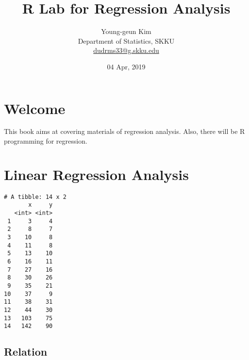 \documentclass[]{book}
\title{R Lab for Regression Analysis}
\author{Young-geun Kim\\
Department of Statistics, SKKU\\
\href{mailto: dudrms33@g.skku.edu}{dudrms33@g.skku.edu}}
\date{04 Apr, 2019}
\newenvironment{Shaded}{\begin{snugshade}}{\end{snugshade}}
\newcommand{\KeywordTok}[1]{\textcolor[rgb]{0.13,0.29,0.53}{\textbf{#1}}}
\newcommand{\DataTypeTok}[1]{\textcolor[rgb]{0.13,0.29,0.53}{#1}}
\newcommand{\StringTok}[1]{\textcolor[rgb]{0.31,0.60,0.02}{#1}}
\newcommand{\OperatorTok}[1]{\textcolor[rgb]{0.81,0.36,0.00}{\textbf{#1}}}
\newcommand{\NormalTok}[1]{#1}
\let\oldmaketitle\maketitle
\theoremstyle{definition}
\theoremstyle{definition}
\theoremstyle{definition}
\theoremstyle{remark}
\begin{document}
\maketitle

\begin{titlepage}
  
\end{titlepage}

\let\maketitle\oldmaketitle
\maketitle

{
\setcounter{tocdepth}{1}
\tableofcontents
}
\chapter*{Welcome}\label{welcome}

 This book aims at covering materials of regression analysis. Also,
there will be R programming for regression.

\chapter*{Linear Regression Analysis}\label{linear-regression-analysis}

\begin{Shaded}
\end{Shaded}

\begin{verbatim}
# A tibble: 14 x 2
       x     y
   <int> <int>
 1     3     4
 2     8     7
 3    10     8
 4    11     8
 5    13    10
 6    16    11
 7    27    16
 8    30    26
 9    35    21
10    37     9
11    38    31
12    44    30
13   103    75
14   142    90
\end{verbatim}

\section*{Relation}\label{relation}
\end{document}
